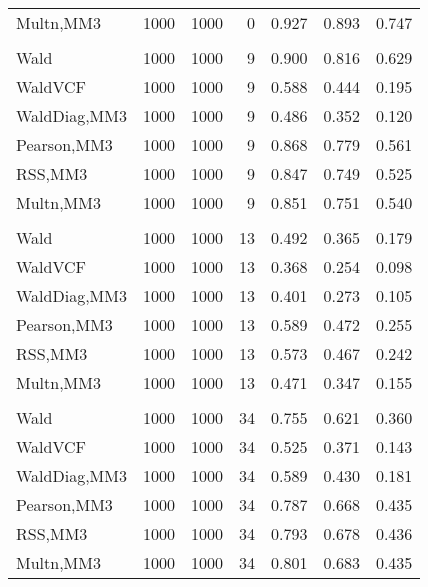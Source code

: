 \documentclass[
]{article}
\begin{document}
\begin{table}[H]
{\begin{tabular}[t]{lrrrrrr}
\hspace{1em}Multn,MM3 & 1000 & 1000 & 0 & 0.927 & 0.893 & 0.747\\
\addlinespace[0.3em]
\multicolumn{7}{l}{\textbf{1F 15V}}\\
\hspace{1em}Wald & 1000 & 1000 & 9 & 0.900 & 0.816 & 0.629\\
\hspace{1em}WaldVCF & 1000 & 1000 & 9 & 0.588 & 0.444 & 0.195\\
\hspace{1em}WaldDiag,MM3 & 1000 & 1000 & 9 & 0.486 & 0.352 & 0.120\\
\hspace{1em}Pearson,MM3 & 1000 & 1000 & 9 & 0.868 & 0.779 & 0.561\\
\hspace{1em}RSS,MM3 & 1000 & 1000 & 9 & 0.847 & 0.749 & 0.525\\
\hspace{1em}Multn,MM3 & 1000 & 1000 & 9 & 0.851 & 0.751 & 0.540\\
\addlinespace[0.3em]
\multicolumn{7}{l}{\textbf{2F 10V}}\\
\hspace{1em}Wald & 1000 & 1000 & 13 & 0.492 & 0.365 & 0.179\\
\hspace{1em}WaldVCF & 1000 & 1000 & 13 & 0.368 & 0.254 & 0.098\\
\hspace{1em}WaldDiag,MM3 & 1000 & 1000 & 13 & 0.401 & 0.273 & 0.105\\
\hspace{1em}Pearson,MM3 & 1000 & 1000 & 13 & 0.589 & 0.472 & 0.255\\
\hspace{1em}RSS,MM3 & 1000 & 1000 & 13 & 0.573 & 0.467 & 0.242\\
\hspace{1em}Multn,MM3 & 1000 & 1000 & 13 & 0.471 & 0.347 & 0.155\\
\addlinespace[0.3em]
\multicolumn{7}{l}{\textbf{3F 15V}}\\
\hspace{1em}Wald & 1000 & 1000 & 34 & 0.755 & 0.621 & 0.360\\
\hspace{1em}WaldVCF & 1000 & 1000 & 34 & 0.525 & 0.371 & 0.143\\
\hspace{1em}WaldDiag,MM3 & 1000 & 1000 & 34 & 0.589 & 0.430 & 0.181\\
\hspace{1em}Pearson,MM3 & 1000 & 1000 & 34 & 0.787 & 0.668 & 0.435\\
\hspace{1em}RSS,MM3 & 1000 & 1000 & 34 & 0.793 & 0.678 & 0.436\\
\hspace{1em}Multn,MM3 & 1000 & 1000 & 34 & 0.801 & 0.683 & 0.435\\
\bottomrule
\end{tabular}}
\endgroup{}
\end{table}
\end{document}
